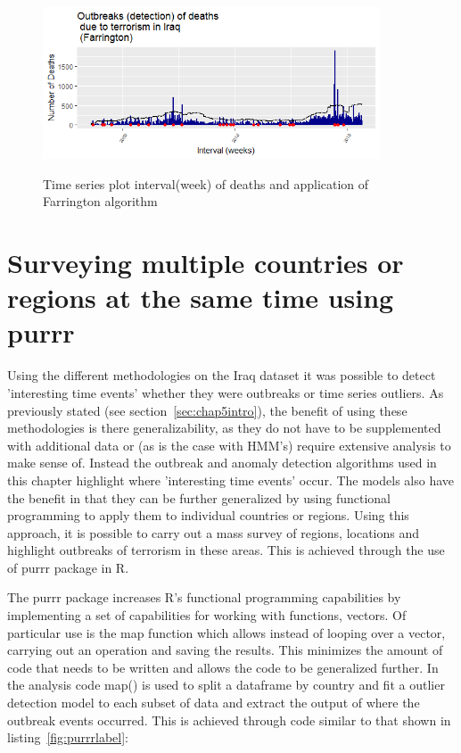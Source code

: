 \begin{figure}[t]
\includegraphics[width=10cm]{Peters_experiment_markdown_files/figure-latex/Rplot02_Farrington_detected_Outbreaks.png}
\label{fig:tseriesFarrington}
\centering
\caption{Time series plot interval(week) of deaths and application of Farrington algorithm}
\end{figure}

\section{Surveying multiple countries or regions at the same time using purrr}

Using the different methodologies on the Iraq dataset it was possible to detect 'interesting time events' whether they were outbreaks or time series outliers. As previously stated (see section~\ref{sec:chap5intro}), the benefit of using these methodologies is there generalizability, as they do not have to be supplemented with additional data or (as is the case with HMM's) require extensive analysis to make sense of. Instead the outbreak and anomaly detection algorithms used in this chapter highlight where 'interesting time events' occur. The models also have the benefit in that they can be further generalized by using functional programming to apply them to individual countries or regions. Using this approach, it is possible to carry out a mass survey of regions, locations and highlight outbreaks of terrorism in these areas. This is achieved through the use of purrr package \citep{purrrWickham2016} in R. 

The purrr package \citep{wickham2016r} increases R's functional programming capabilities by implementing a set of capabilities for working with functions, vectors. Of particular use is the map function which allows instead of looping over a vector, carrying out an operation and saving the results. This minimizes the amount of code that needs to be written and allows the code to be generalized further. In the analysis code map() is used to split a dataframe by country and fit a outlier detection model to each subset of data and extract the output of where the outbreak events occurred. This is achieved through code similar to that shown in listing~\ref{fig:purrrlabel}: 

